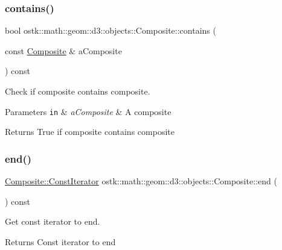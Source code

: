 \subsubsection{\texorpdfstring{contains()}{contains()}\hspace{0.1cm}{\footnotesize\ttfamily [2/2]}}
{\footnotesize\ttfamily bool ostk\+::math\+::geom\+::d3\+::objects\+::\+Composite\+::contains (\begin{DoxyParamCaption}\item[{const \hyperlink{classostk_1_1math_1_1geom_1_1d3_1_1objects_1_1_composite}{Composite} \&}]{a\+Composite }\end{DoxyParamCaption}) const}



Check if composite contains composite. 


\begin{DoxyParams}[1]{Parameters}
\mbox{\tt in}  & {\em a\+Composite} & A composite \\
\hline
\end{DoxyParams}
\begin{DoxyReturn}{Returns}
True if composite contains composite 
\end{DoxyReturn}
\mbox{\label{classostk_1_1math_1_1geom_1_1d3_1_1objects_1_1_composite_abaaf231b9d0b5924ceb2b89db38cfe25}} 
\subsubsection{\texorpdfstring{end()}{end()}}
{\footnotesize\ttfamily \hyperlink{classostk_1_1math_1_1geom_1_1d3_1_1objects_1_1_composite_ab1f78408fec2e435dc1172cf2675b0a9}{Composite\+::\+Const\+Iterator} ostk\+::math\+::geom\+::d3\+::objects\+::\+Composite\+::end (\begin{DoxyParamCaption}{ }\end{DoxyParamCaption}) const}



Get const iterator to end. 

\begin{DoxyReturn}{Returns}
Const iterator to end 
\end{DoxyReturn}
\mbox{\label{classostk_1_1math_1_1geom_1_1d3_1_1objects_1_1_composite_a254785a50dc8deece73e24d2991704b6}} 
